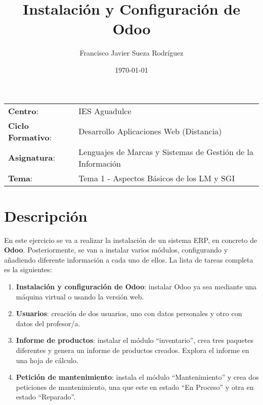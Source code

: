 


\title{
\normalfont \normalsize
\huge \textbf{Instalación y Configuración de Odoo}
}
\author{Francisco Javier Sueza Rodríguez}
\date{\normalsize\today}



\maketitle

\vspace{2ex}

\begin{center}
    \begin{tabular}{l l}
        \textbf{Centro}: & IES Aguadulce \\
        \textbf{Ciclo Formativo}: & Desarrollo Aplicaciones Web (Distancia)\\
        \textbf{Asignatura}: & Lenguajes de Marcas y Sistemas de Gestión de la Información\\
        \textbf{Tema}: & Tema 1 - Aspectos Básicos de los LM y SGI \\
    \end{tabular}
\end{center}

\vspace{10ex}

\section{Descripción}
En este ejercicio se va a realizar la instalación de un sistema ERP, en concreto de \textbf{Odoo}. Posteriormente, se van a instalar varios módulos, configurando y añadiendo diferente información a cada uno de ellos. La lista de tareas completa es la siguientes:

\begin{enumerate}
    \item \textbf{Instalación y configuración de Odoo}: instalar Odoo ya sea mediante una máquina virtual o usando la versión web.
    \item \textbf{Usuarios}: creación de dos usuarios, uno con datos personales y otro con datos del profesor/a.
    \item \textbf{Informe de productos}: instalar el módulo ``inventario'', crea tres paquetes diferentes y genera un informe de productos creados. Explora el informe en una hoja de cálculo.
    \item \textbf{Petición de mantenimiento}: instala el módulo ``Mantenimiento'' y crea dos peticiones de mantenimiento, una que este en estado ``En Proceso'' y otra en estado ``Reparado''.
\end{enumerate}

